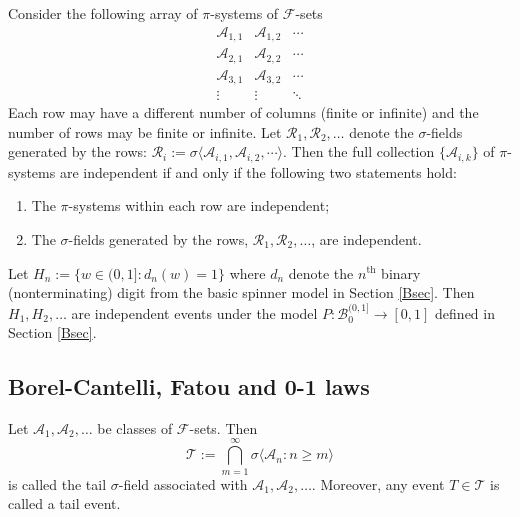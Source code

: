 \begin{theorem}[{\bf ANOVA${}^*$}]
Consider the following array of $\pi$-systems of $\mathcal F$-sets
\[
\begin{array}{ccc}
\mathscr A_{1,1} & \mathscr A_{1,2} & \cdots \\
\mathscr A_{2,1} & \mathscr A_{2,2} & \cdots \\
\mathscr A_{3,1} & \mathscr A_{3,2} & \cdots \\
\vdots & \vdots & \ddots
\end{array}
\]
Each row may have a different number of columns (finite or infinite) and the number of rows may be finite or infinite.
Let $\mathscr R_1,\mathscr R_2,\ldots$ denote the $\sigma$-fields generated by the rows: $\mathscr R_i:=\sigma\langle \mathscr A_{i,1}, \mathscr A_{i,2} , \cdots \rangle $.
 Then the full collection  $\{ \mathscr A_{i,k} \}$ of $\pi$-systems are independent  if and only if the following two statements hold:
\begin{enumerate}
\item The $\pi$-systems within each row are independent;
\item The  $\sigma$-fields generated by the rows, $\mathscr R_1,\mathscr R_2,\ldots$, are independent.
\end{enumerate}
\end{theorem}



\begin{theorem}\label{ibd}
Let $H_n:=\{w\in(0,1]: d_n(w)=1  \}$ where $d_n$ denote the $n^\text{th}$ binary (nonterminating) digit from the basic spinner model in Section \ref{Bsec}. Then $H_1, H_2, \ldots$ are independent events under the model $P:\mathcal B_0^{(0,1]}\rightarrow [0,1]$ defined in Section \ref{Bsec}.
\end{theorem}



\subsection{Borel-Cantelli, Fatou and 0-1 laws}

\begin{definition}
Let $\mathscr A_1, \mathscr A_2, \ldots$ be classes of $\mathcal F$-sets. Then
\[ \mathcal T :=\bigcap_{m=1}^\infty \sigma\langle \mathscr A_n: n\geq m\rangle \]
is called the {tail $\sigma$-field associated with $\mathscr A_1, \mathscr A_2, \ldots$}. Moreover, any event $T\in \mathcal T$ is called a {tail event}.
\end{definition}

